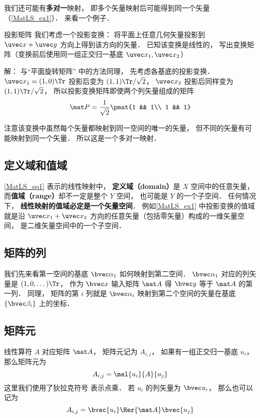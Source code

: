我们还可能有\textbf{多对一}映射， 即多个矢量映射后可能得到同一个矢量（\autoref{MatLS_ex1}）． 来看一个例子．

\begin{example}{投影矩阵}\label{MatLS_ex1}
我们考虑一个投影变换： 将平面上任意几何矢量投影到 $\uvec x + \uvec y$ 方向上得到该方向的矢量． 已知该变换是线性的， 写出变换矩阵（变换前后使用同一组正交归一基底 $\uvec x_1, \uvec x_2$）

解： 与“平面旋转矩阵” 中的方法同理， 先考虑各基底的投影变换． $\uvec x_1 = (1, 0)\Tr$ 投影后变为 $(1, 1)\Tr /\sqrt2$， $\uvec x_2$ 投影后同样变为 $(1, 1)\Tr /\sqrt2$， 所以投影变换矩阵即使两个列矢量组成的矩阵
\begin{equation}
\mat P = \frac{1}{\sqrt{2}} \pmat{1 && 1\\ 1 && 1}
\end{equation}

注意该变换中虽然每个矢量都映射到同一空间的唯一的矢量， 但不同的矢量有可能映射到同一个矢量． 所以这是一个多对一映射．
\end{example}

\subsection{定义域和值域}
\autoref{MatLS_eq1} 表示的线性映射中， \textbf{定义域（domain）}是 $X$ 空间中的任意矢量， 而\textbf{值域（range）}却不一定是整个 $Y$ 空间， 也可能是 $Y$ 的一个子空间． 任何情况下， \textbf{线性映射的值域必定是一个矢量空间}． 例如\autoref{MatLS_ex1} 中投影变换的值域就是沿 $\uvec x_1 + \uvec x_2$ 方向的任意矢量（包括零矢量）构成的一维矢量空间， 是二维矢量空间中的一个子空间．


\subsection{矩阵的列}
我们先来看第一空间的基底 $\bvec \alpha_1$ 如何映射到第二空间． $\bvec\alpha_1$ 对应的列矢量是 $(1, 0, \dots)\Tr$， 作为 $\bvec x$ 输入矩阵 $\mat A$ 得 $\bvec y$ 等于 $\mat A$ 的第一列． 同理， 矩阵的第 $i$ 列就是 $\bvec\alpha_i$ 映射到第二个空间的矢量在基底 $\{\bvec \beta_i\}$ 上的坐标．


\subsection{矩阵元}
线性算符 $A$ 对应矩阵 $\mat A$， 矩阵元记为 $A_{i,j}$， 如果有一组正交归一基底 $u_i$， 那么矩阵元为
\begin{equation}
A_{i,j} = \mel{u_i}{A}{u_j}
\end{equation}
这里我们使用了狄拉克符号 表示点乘． 若 $u_i$ 的列矢量为 $\bvec u_i$， 那么也可以记为
\begin{equation}
A_{i,j} = \bvec {u_i}\Her {\mat A} \bvec {u_j}
\end{equation}

